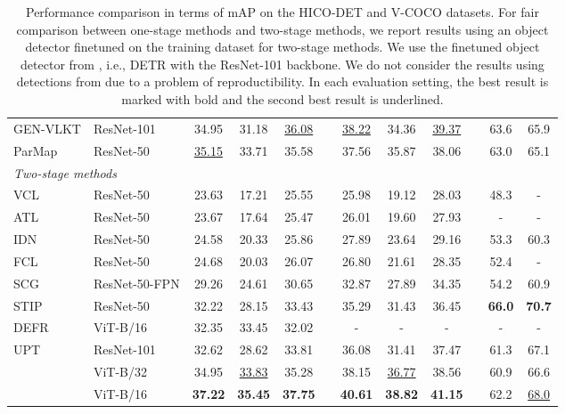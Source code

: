 \documentclass[10pt,twocolumn,letterpaper]{article}
\begin{document}
\begin{table*}[t]
\begin{center}
{\begin{tabular}{llcccccccccc}
GEN-VLKT \cite{liao2022gen} & ResNet-101 & 34.95 & 31.18 & \underline{36.08} && \underline{38.22} & 34.36 & \underline{39.37} && 63.6 & 65.9 \\
ParMap \cite{wu2022mining} & ResNet-50 & \underline{35.15} & 33.71 & 35.58 && 37.56 & 35.87 & 38.06 && 63.0 & 65.1\\
\hline
\multicolumn{5}{l}{\emph{Two-stage methods}} \\
VCL \cite{hou2020visual}    & ResNet-50 & 23.63 & 17.21 & 25.55 && 25.98 & 19.12 & 28.03 && 48.3 & -\\
ATL \cite{hou2021affordance}  & ResNet-50 & 23.67 & 17.64 & 25.47 && 26.01 & 19.60 & 27.93 && - & -\\
IDN \cite{li2020hoi}  & ResNet-50 & 24.58 & 20.33 & 25.86 && 27.89 & 23.64 & 29.16 && 53.3 & 60.3\\
FCL \cite{hou2021detecting} & ResNet-50 & 24.68 & 20.03 & 26.07 && 26.80 & 21.61 & 28.35 && 52.4 & - \\
SCG \cite{zhang2021spatially} & ResNet-50-FPN & 29.26 & 24.61 & 30.65 && 32.87 & 27.89 & 34.35 && 54.2 & 60.9 \\
STIP \cite{zhang2022exploring} & ResNet-50 & 32.22 & 28.15 & 33.43 && 35.29 & 31.43 & 36.45 && \textbf{66.0} & \textbf{70.7} \\
DEFR \cite{jin2022overlooked} & ViT-B/16 & 32.35 & 33.45 & 32.02 && - & - & - && - & - \\
UPT \cite{zhang2022efficient} & ResNet-101 & 32.62 & 28.62 & 33.81 && 36.08 & 31.41 & 37.47 && 61.3 & 67.1 \\
\rowcolor{Gray}
 & ViT-B/32 & 34.95 & \underline{33.83} & 35.28 && 38.15 & \underline{36.77} & 38.56 && 60.9 & 66.6 \\
\rowcolor{Gray}
 & ViT-B/16 & \textbf{37.22} & \textbf{35.45} & \textbf{37.75} && \textbf{40.61} & \textbf{38.82} & \textbf{41.15} && 62.2 & \underline{68.0} \\
\hline
\end{tabular}}
\end{center}
\vspace{-0.2in}
\caption{Performance comparison in terms of mAP on the HICO-DET and V-COCO datasets. For fair comparison between one-stage methods and two-stage methods, we report results using an object detector finetuned on the training dataset for two-stage methods. We use the finetuned object detector from \cite{zhang2022efficient}, i.e., DETR with the ResNet-101 backbone. We do not consider the results using detections from \cite{gao2020drg} due to a problem of reproductibility. In each evaluation setting, the best result is marked with bold and the second best result is underlined.} 
\label{tab:compare-all}
\end{table*}
\end{document}
